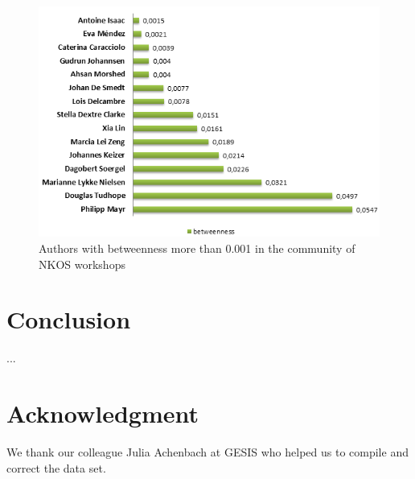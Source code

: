 \documentclass[runningheads,a4paper]{llncs}
\begin{document}
\begin{figure}
\centering
\includegraphics[width=0.7\linewidth]{betweenness}
\caption{Authors with betweenness more than 0.001 in the community of NKOS workshops}
\label{fig:betweenness}
\end{figure}




\section{Conclusion}\label{concl}
...%


\section{Acknowledgment}\label{sec:ACKNOWLEDGMENTS}
We thank our colleague Julia Achenbach at GESIS who helped us to compile and correct the data set.


 
\end{document}
